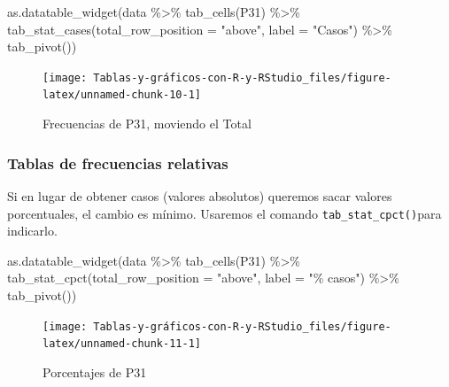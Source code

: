 \documentclass[
]{book}
\newenvironment{Shaded}{\begin{snugshade}}{\end{snugshade}}
\newcommand{\AttributeTok}[1]{\textcolor[rgb]{0.77,0.63,0.00}{#1}}
\newcommand{\FunctionTok}[1]{\textcolor[rgb]{0.00,0.00,0.00}{#1}}
\newcommand{\NormalTok}[1]{#1}
\newcommand{\SpecialCharTok}[1]{\textcolor[rgb]{0.00,0.00,0.00}{#1}}
\newcommand{\StringTok}[1]{\textcolor[rgb]{0.31,0.60,0.02}{#1}}
\begin{document}
\begin{Shaded}
\begin{Highlighting}[]
\FunctionTok{as.datatable\_widget}\NormalTok{(data }\SpecialCharTok{\%\textgreater{}\%} \FunctionTok{tab\_cells}\NormalTok{(P31) }\SpecialCharTok{\%\textgreater{}\%} \FunctionTok{tab\_stat\_cases}\NormalTok{(}\AttributeTok{total\_row\_position =} \StringTok{"above"}\NormalTok{, }
  \AttributeTok{label =} \StringTok{"Casos"}\NormalTok{) }\SpecialCharTok{\%\textgreater{}\%} \FunctionTok{tab\_pivot}\NormalTok{())}
\end{Highlighting}
\end{Shaded}

\begin{figure}[H]

{\centering \texttt{[image: Tablas-y-gráficos-con-R-y-RStudio\_files/figure-latex/unnamed-chunk-10-1]} 

}

\caption{Frecuencias de P31, moviendo el Total}\label{fig:unnamed-chunk-10}
\end{figure}

\hypertarget{tablas-de-frecuencias-relativas}{%
\subsubsection{Tablas de frecuencias relativas}\label{tablas-de-frecuencias-relativas}}

Si en lugar de obtener casos (valores absolutos) queremos sacar valores porcentuales, el cambio es mínimo. Usaremos el comando \texttt{tab\_stat\_cpct()}para indicarlo.

\begin{Shaded}
\begin{Highlighting}[]
\FunctionTok{as.datatable\_widget}\NormalTok{(data }\SpecialCharTok{\%\textgreater{}\%} \FunctionTok{tab\_cells}\NormalTok{(P31) }\SpecialCharTok{\%\textgreater{}\%} \FunctionTok{tab\_stat\_cpct}\NormalTok{(}\AttributeTok{total\_row\_position =} \StringTok{"above"}\NormalTok{, }
  \AttributeTok{label =} \StringTok{"\% casos"}\NormalTok{) }\SpecialCharTok{\%\textgreater{}\%} \FunctionTok{tab\_pivot}\NormalTok{())}
\end{Highlighting}
\end{Shaded}

\begin{figure}[H]

{\centering \texttt{[image: Tablas-y-gráficos-con-R-y-RStudio\_files/figure-latex/unnamed-chunk-11-1]} 

}

\caption{Porcentajes de P31}\label{fig:unnamed-chunk-11}
\end{figure}
\end{document}
